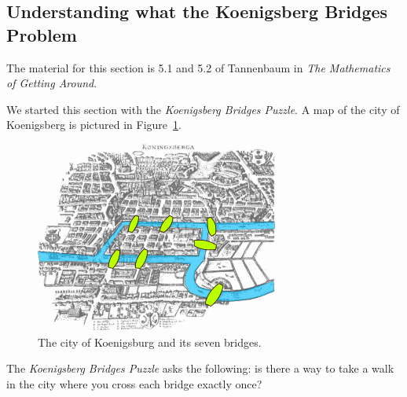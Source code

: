 \documentclass[11pt, letterpaper]{article}
\begin{document}
\subsection{Understanding what the Koenigsberg Bridges Problem}
The material for this section is 5.1 and 5.2 of Tannenbaum in \emph{The Mathematics of Getting Around}. 

We started this section with the \emph{Koenigsberg Bridges Puzzle}. 
A map of the city of Koenigsberg is pictured in Figure~\ref{F:seven-bridges}.
\begin{figure}[h]
	\begin{center}
		\includegraphics[scale=0.5]{konigsberg_bridges.png}
	\end{center}
	\caption{The city of Koenigsburg and its seven bridges.}\label{F:seven-bridges}
\end{figure}
The \emph{Koenigsberg Bridges Puzzle} asks the following: is there a way to take a walk in the city where you cross each bridge exactly once?
\end{document}
